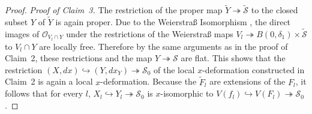\documentclass[11pt,twoside]{amsart}
\theoremstyle{plain}
\newcommand{\Sm}{\mathcal{S}}
\newcommand{\Sh}[1]{\mathcal{#1}} %
\begin{document}
\begin{proof}
\emph{Proof of Claim~3.} The restriction of the proper map $\tilde{Y} \twoheadrightarrow\tilde{\Sm}$ to the closed subset $Y$ of $\tilde{Y}$ is again proper. Due to the Weierstra{\ss} Isomorphism \cite[Chapter~2 \S2.]{GR:84}, the direct images of $\Sh{O}_{V_l\cap Y}$ under the restrictions of the Weierstra\ss{} maps $V_l\twoheadrightarrow B(0,\delta_1)\times\tilde{\Sm}$ to $V_l \cap Y$ are locally free. Therefore by the same arguments as in the proof of Claim~2, these restrictions and the map $Y \twoheadrightarrow \Sm$ are flat. 
%
%
This shows that the restriction $(X,dx) \hookrightarrow (Y,dx_Y) \twoheadrightarrow \Sm_0$ of the local $x$-deformation constructed in Claim~2 is again a local $x$-deformation. Because the $\tilde{F}_l$ are extensions of the $F_l$, it follows that for every $l$, $X_l\hookrightarrow Y_l\twoheadrightarrow{\Sh{S}}_0$ is $x$-isomorphic to $V(f_l)\hookrightarrow V(F_l)\twoheadrightarrow\Sm_0$.
\end {proof}
\end{document}
